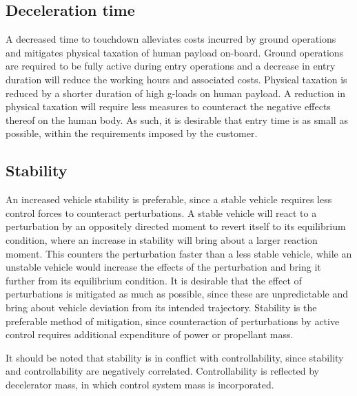 \subsection{Deceleration time}
A decreased time to touchdown alleviates costs incurred by ground operations and mitigates physical taxation of human payload on-board. Ground operations are required to be fully active during entry operations and a decrease in entry duration will reduce the working hours and associated costs. Physical taxation is reduced by a shorter duration of high g-loads on human payload. A reduction in physical taxation will require less measures to counteract the negative effects thereof on the human body. As such, it is desirable that entry time is as small as possible, within the requirements imposed by the customer.


\subsection{Stability}
An increased vehicle stability is preferable, since a stable vehicle requires less control forces to counteract perturbations. A stable vehicle will react to a perturbation by an oppositely directed moment to revert itself to its equilibrium condition, where an increase in stability will bring about a larger reaction moment. This counters the perturbation faster than a less stable vehicle, while an unstable vehicle would increase the effects of the perturbation and bring it further from its equilibrium condition. It is desirable that the effect of perturbations is mitigated as much as possible, since these are unpredictable and bring about vehicle deviation from its intended trajectory. Stability is the preferable method of mitigation, since counteraction of perturbations by active control requires additional expenditure of power or propellant mass. 

It should be noted that stability is in conflict with controllability, since stability and controllability are negatively correlated. Controllability is reflected by decelerator mass, in which control system mass is incorporated.

